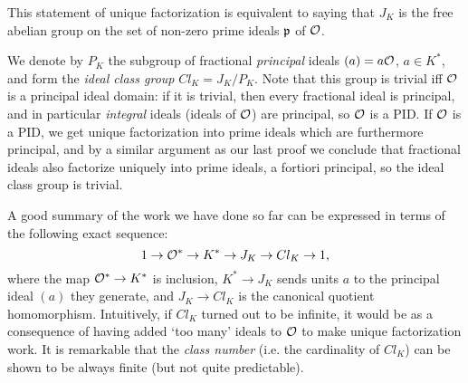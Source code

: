 This statement of unique factorization is equivalent to saying that $J_K$ is the free abelian group on the set of non-zero prime ideals $\mathfrak{p}$ of $\mathcal{O}$.

We denote by $P_K$ the subgroup of fractional \emph{principal} ideals $(a)=a\mathcal{O}$, $a\in K^*$, and form the \emph{ideal class group} $Cl_K=J_K/P_K$. Note that this group is trivial iff $\mathcal{O}$ is a principal ideal domain: if it is trivial, then every fractional ideal is principal, and in particular \emph{integral} ideals (ideals of $\mathcal{O}$) are principal, so $\mathcal{O}$ is a PID. If $\mathcal{O}$ is a PID, we get unique factorization into prime ideals which are furthermore principal, and by a similar argument as our last proof we conclude that fractional ideals also factorize uniquely into prime ideals, a fortiori principal, so the ideal class group is trivial.

A good summary of the work we have done so far can be expressed in terms of the following exact sequence:
\[
	1 \to \mathcal{O}^* \to K^* \to J_K \to Cl_K \to 1,
\]
where the map $\mathcal{O}^*\to K^*$ is inclusion, $K^*\to J_K$ sends units $a$ to the principal ideal $(a)$ they generate, and $J_K\to Cl_K$ is the canonical quotient homomorphism. Intuitively, if $Cl_K$ turned out to be infinite, it would be as a consequence of having added `too many' ideals to $\mathcal{O}$ to make unique factorization work. It is remarkable that the \emph{class number} (i.e. the cardinality of $Cl_K$) can be shown to be always finite (but not quite predictable).
